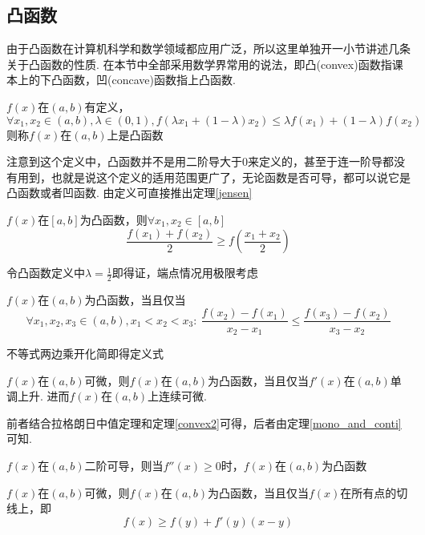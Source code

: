 \subsection{凸函数}
\label{convexfun}
由于凸函数在计算机科学和数学领域都应用广泛，所以这里单独开一小节讲述几条关于凸函数的性质. 在本节中全部采用数学界常用的说法，即凸(convex)函数指课本上的下凸函数，凹(concave)函数指上凸函数.
\begin{definition}[凸函数]
$f(x)$在$(a,b)$有定义，
\[\forall x_1,x_2\in (a,b),\lambda\in(0,1),f(\lambda x_1+(1-\lambda)x_2)\leq\lambda f(x_1)+(1-\lambda)f(x_2)\]
则称$f(x)$在$(a,b)$上是凸函数
\end{definition}
注意到这个定义中，凸函数并不是用二阶导大于$0$来定义的，甚至于连一阶导都没有用到，也就是说这个定义的适用范围更广了，无论函数是否可导，都可以说它是凸函数或者凹函数. 由定义可直接推出定理\ref{jensen}
\begin{theorem}
\label{jensen}
$f(x)$在$[a,b]$为凸函数，则$\forall x_1,x_2\in[a,b]$
\[\frac{f(x_1)+f(x_2)}{2}\geq f\left(\frac{x_1+x_2}{2}\right)\]
\end{theorem}
\begin{analysis}
令凸函数定义中$\displaystyle\lambda=\frac{1}{2}$即得证，端点情况用极限考虑
\end{analysis}
\begin{theorem}
\label{convex2}
$f(x)$在$(a,b)$为凸函数，当且仅当
\[\forall x_1,x_2,x_3\in(a,b),x_1<x_2<x_3:\:\frac{f(x_2)-f(x_1)}{x_2-x_1}\leq\frac{f(x_3)-f(x_2)}{x_3-x_2}\]
\end{theorem}
\begin{analysis}
不等式两边乘开化简即得定义式
\end{analysis}
\begin{theorem}
\label{diff_and_convex}
$f(x)$在$(a,b)$可微，则$f(x)$在$(a,b)$为凸函数，当且仅当$f'(x)$在$(a,b)$单调上升. 进而$f(x)$在$(a,b)$上连续可微. 
\end{theorem}
\begin{analysis}
前者结合拉格朗日中值定理和定理\ref{convex2}可得，后者由定理\ref{mono_and_conti}可知.
\end{analysis}
\begin{corollary_convex}
$f(x)$在$(a,b)$二阶可导，则当$f''(x)\geq 0$时，$f(x)$在$(a,b)$为凸函数
\end{corollary_convex}
\begin{theorem}
\label{convex_and_tangent}
$f(x)$在$(a,b)$可微，则$f(x)$在$(a,b)$为凸函数，当且仅当$f(x)$在所有点的切线上，即
\[f(x)\geq f(y)+f'(y)(x-y)\]
\end{theorem}
